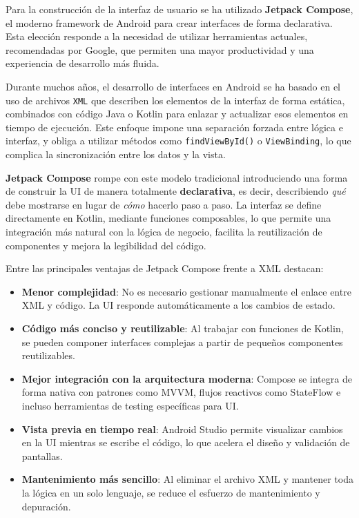 Para la construcción de la interfaz de usuario se ha utilizado \textbf{Jetpack Compose}, el moderno framework de Android para crear interfaces de forma declarativa. Esta elección responde a la necesidad de utilizar herramientas actuales, recomendadas por Google, que permiten una mayor productividad y una experiencia de desarrollo más fluida.

Durante muchos años, el desarrollo de interfaces en Android se ha basado en el uso de archivos \texttt{XML} que describen los elementos de la interfaz de forma estática, combinados con código Java o Kotlin para enlazar y actualizar esos elementos en tiempo de ejecución. Este enfoque impone una separación forzada entre lógica e interfaz, y obliga a utilizar métodos como \texttt{findViewById()} o \texttt{ViewBinding}, lo que complica la sincronización entre los datos y la vista.

\textbf{Jetpack Compose} rompe con este modelo tradicional introduciendo una forma de construir la UI de manera totalmente \textbf{declarativa}, es decir, describiendo \textit{qué} debe mostrarse en lugar de \textit{cómo} hacerlo paso a paso. La interfaz se define directamente en Kotlin, mediante funciones composables, lo que permite una integración más natural con la lógica de negocio, facilita la reutilización de componentes y mejora la legibilidad del código.

Entre las principales ventajas de Jetpack Compose frente a XML destacan:

\begin{itemize}
    \item \textbf{Menor complejidad}: No es necesario gestionar manualmente el enlace entre XML y código. La UI responde automáticamente a los cambios de estado.

    \item \textbf{Código más conciso y reutilizable}: Al trabajar con funciones de Kotlin, se pueden componer interfaces complejas a partir de pequeños componentes reutilizables.

    \item \textbf{Mejor integración con la arquitectura moderna}: Compose se integra de forma nativa con patrones como MVVM, flujos reactivos como StateFlow e incluso herramientas de testing específicas para UI.

    \item \textbf{Vista previa en tiempo real}: Android Studio permite visualizar cambios en la UI mientras se escribe el código, lo que acelera el diseño y validación de pantallas.

    \item \textbf{Mantenimiento más sencillo}: Al eliminar el archivo XML y mantener toda la lógica en un solo lenguaje, se reduce el esfuerzo de mantenimiento y depuración.
\end{itemize}

